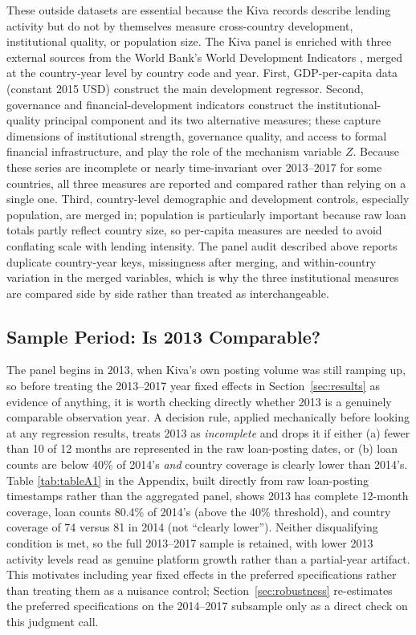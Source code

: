 \documentclass[12pt]{article}
\begin{document}
These outside datasets are essential because the Kiva records describe lending activity but do not by
themselves measure cross-country development, institutional quality, or population size. The Kiva
panel is enriched with three external sources from the World Bank's World Development Indicators
\citep{worldbank_wdi}, merged at the country-year level by country code and year. First, GDP-per-capita
data (constant 2015 USD) construct the main development regressor. Second, governance and
financial-development indicators construct the institutional-quality principal component and its two
alternative measures; these capture dimensions of institutional strength, governance quality, and
access to formal financial infrastructure, and play the role of the mechanism variable $Z$. Because
these series are incomplete or nearly time-invariant over 2013--2017 for some countries, all three
measures are reported and compared rather than relying on a single one. Third, country-level
demographic and development controls, especially population, are merged in; population is particularly
important because raw loan totals partly reflect country size, so per-capita measures are needed to
avoid conflating scale with lending intensity. The panel audit described above reports duplicate
country-year keys, missingness after merging, and within-country variation in the merged variables,
which is why the three institutional measures are compared side by side rather than treated as
interchangeable.

\subsection{Sample Period: Is 2013 Comparable?}
\label{sec:sample-period}

The panel begins in 2013, when Kiva's own posting volume was still ramping up, so before treating the
2013--2017 year fixed effects in Section~\ref{sec:results} as evidence of anything, it is worth
checking directly whether 2013 is a genuinely comparable observation year. A decision rule, applied
mechanically before looking at any regression results, treats 2013 as \emph{incomplete} and drops it
if either (a) fewer than 10 of 12 months are represented in the raw loan-posting dates, or (b) loan
counts are below 40\% of 2014's \emph{and} country coverage is clearly lower than 2014's. Table
\ref{tab:tableA1} in the Appendix, built directly from raw loan-posting timestamps rather than the
aggregated panel, shows 2013 has complete 12-month coverage, loan counts 80.4\% of 2014's (above the
40\% threshold), and country coverage of 74 versus 81 in 2014 (not ``clearly lower''). Neither
disqualifying condition is met, so the full 2013--2017 sample is retained, with lower 2013 activity
levels read as genuine platform growth rather than a partial-year artifact. This motivates including
year fixed effects in the preferred specifications rather than treating them as a nuisance control;
Section~\ref{sec:robustness} re-estimates the preferred specifications on the 2014--2017 subsample
only as a direct check on this judgment call.
\end{document}
